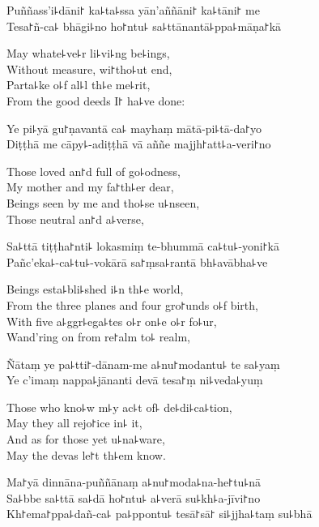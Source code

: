 Puññass'i꜕dāni꜓ ka꜕ta꜕ssa yān'aññāni꜓ ka꜕tāni꜓ me\\
Tesa꜓ñ-ca꜕ bhāgi꜕no ho꜓ntu꜕ sa꜕ttānantā꜕ppa꜕māṇa꜓kā

\begin{english}
  May whate꜕ve꜕r li꜕vi꜕ng be꜕ings,\\
  Without measure, wi꜓tho꜕ut end,\\
  Parta꜕ke o꜕f al꜕l th꜕e me꜕rit,\\
  From the good deeds I꜓ ha꜕ve done:
\end{english}

Ye pi꜕yā gu꜓ṇavantā ca꜕ mayhaṃ mātā-pi꜕tā-da꜓yo\\
Diṭṭhā me cāpy꜕-adiṭṭhā vā aññe majjh꜓att꜕a-veri꜓no

\begin{english}
  Those loved an꜓d full of go꜕odness,\\
  My mother and my fa꜓th꜕er dear,\\
  Beings seen by me and tho꜕se u꜕nseen,\\
  Those neutral an꜓d a꜕verse,
\end{english}

Sa꜕ttā tiṭṭha꜓nti꜕ lokasmiṃ te-bhummā ca꜕tu꜕-yoni꜓kā\\
Pañc'eka꜕-ca꜕tu꜕-vokārā sa꜓ṃsa꜕rantā bh꜕avābha꜕ve

\begin{english}
  Beings esta꜕bli꜕shed i꜕n th꜕e world,\\
  From the three planes and four gro꜓unds o꜕f birth,\\
  With five a꜕ggr꜕ega꜕tes o꜕r on꜕e o꜕r fo꜕ur,\\
  Wand'ring on from re꜓alm to꜕ realm,
\end{english}

Ñātaṃ ye pa꜕tti꜓-dānam-me a꜕nu꜓modantu꜕ te sa꜕yaṃ\\
Ye c'imaṃ nappa꜕jānanti devā tesa꜓ṃ ni꜕veda꜕yuṃ

\begin{english}
  Those who kno꜕w m꜕y ac꜕t of꜕ de꜕di꜕ca꜕tion,\\
  May they all rejo꜓ice in꜕ it,\\
  And as for those yet u꜕na꜕ware,\\
  May the devas le꜓t th꜕em know.
\end{english}

Ma꜓yā dinnāna-puññānaṃ a꜕nu꜓moda꜕na-he꜓tu꜕nā\\
Sa꜕bbe sa꜕ttā sa꜕dā ho꜓ntu꜕ a꜕verā su꜕kh꜕a-jīvi꜓no\\
Kh꜓ema꜓ppa꜕dañ-ca꜕ pa꜕ppontu꜕ tesā꜓sā꜓ si꜕jjha꜕taṃ su꜕bhā

